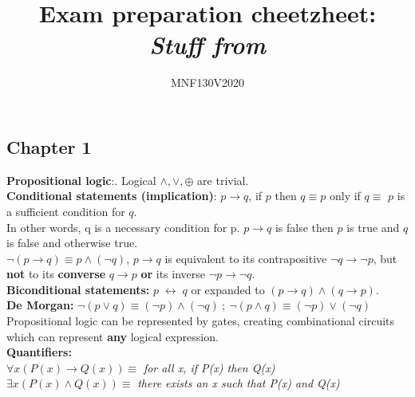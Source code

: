 \documentclass[12pt]{article}
\title{\huge Exam preparation cheetzheet: \\ \textit{Stuff from}}
\author{\LARGE MNF130V2020}
\renewcommand{\iff}{\;\leftrightarrow\;}
\begin{document}
\maketitle

\bigskip

\newpage

\subsection{Chapter 1}
\smallskip
\textbf{Propositional logic}:. Logical $\wedge,\vee,\oplus$ are trivial. \\
\smallskip
\textbf{Conditional statements (implication)}: $p \rightarrow q$, if $p$ then $q \equiv p $ only if $q \equiv$ $p$ is a sufficient condition for $q$. \\
In other words, q is a necessary condition for p. $p \rightarrow q$ is false then $p$ is true and $q$ is false and otherwise true. \\
$\neg(p\rightarrow q)\equiv p \wedge (\neg q)$, $p \rightarrow q$ is equivalent to its contrapositive $\neg q \rightarrow \neg p$, but \textbf{not} to its \textbf{converse} $q \rightarrow p$ \textbf{or} its inverse $\neg p \rightarrow \neg q$. \\
\smallskip
\textbf{Biconditional statements:} $ p \iff q$ or expanded to $(p \rightarrow q) \wedge (q \rightarrow p)$. \\
\smallskip
\textbf{De Morgan:} $\neg(p \vee q) \equiv (\neg p) \wedge (\neg q)\ ;\ \neg(p \wedge q) \equiv (\neg p ) \vee (\neg q) $
\smallskip
Propositional logic can be represented by gates, creating combinational circuits which can represent \textbf{any} logical expression. \\
\medskip
\textbf{Quantifiers:} \\
$
\forall x(P(x) \rightarrow Q(x)) \equiv
$
\textit{for all x, if P(x) then Q(x)} \\
$
\exists x(P(x) \wedge Q(x)) \equiv
$
\textit{there exists an x such that P(x) and Q(x)} \\
\end{document}
